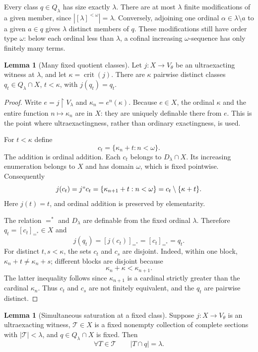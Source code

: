 \documentclass[11pt,letterpaper]{article}
\theoremstyle{definition}
\newtheorem{lemma}[definition]{Lemma}
\numberwithin{equation}{section}
\newcommand{\crit}{\operatorname{crit}}
\newcommand{\restr}{\mathbin{\upharpoonright}}
\newcommand{\Tcal}{\mathcal T}
\begin{document}
Every class $q\in Q_\lambda$ has size exactly $\lambda$. There are at most $\lambda$ finite modifications of a given member, since $|[\lambda]^{<\omega}|=\lambda$. Conversely, adjoining one ordinal $\alpha\in\lambda\setminus a$ to a given $a\in q$ gives $\lambda$ distinct members of $q$. These modifications still have order type $\omega$: below each ordinal less than $\lambda$, a cofinal increasing $\omega$-sequence has only finitely many terms.

\begin{lemma}[Many fixed quotient classes]\label{lem:fixed-classes}
Let $j:X\to V_\theta$ be an ultraexacting witness at $\lambda$, and let $\kappa=\crit(j)$. There are $\kappa$ pairwise distinct classes $q_t\in Q_\lambda\cap X$, $t<\kappa$, with $j(q_t)=q_t$.
\end{lemma}

\begin{proof}
Write $e=j\restr V_\lambda$ and $\kappa_n=e^n(\kappa)$. Because $e\in X$, the ordinal $\kappa$ and the entire function $n\mapsto\kappa_n$ are in $X$: they are uniquely definable there from $e$. This is the point where ultraexactingness, rather than ordinary exactingness, is used.

For $t<\kappa$ define
\[
c_t=\{\kappa_n+t:n<\omega\}.
\]
The addition is ordinal addition. Each $c_t$ belongs to $D_\lambda\cap X$. Its increasing enumeration belongs to $X$ and has domain $\omega$, which is fixed pointwise. Consequently
\[
j(c_t)=j``c_t
 =\{\kappa_{n+1}+t:n<\omega\}
 =c_t\setminus\{\kappa+t\}.
\]
Here $j(t)=t$, and ordinal addition is preserved by elementarity.

The relation $=^*$ and $D_\lambda$ are definable from the fixed ordinal $\lambda$. Therefore $q_t=[c_t]_{=^*}\in X$ and
\[
j(q_t)=[j(c_t)]_{=^*}=[c_t]_{=^*}=q_t.
\]
For distinct $t,s<\kappa$, the sets $c_t$ and $c_s$ are disjoint. Indeed, within one block, $\kappa_n+t\ne\kappa_n+s$; different blocks are disjoint because
\[
\kappa_n+\kappa<\kappa_{n+1}.
\]
The latter inequality follows since $\kappa_{n+1}$ is a cardinal strictly greater than the cardinal $\kappa_n$. Thus $c_t$ and $c_s$ are not finitely equivalent, and the $q_t$ are pairwise distinct.
\end{proof}

\begin{lemma}[Simultaneous saturation at a fixed class]\label{lem:saturation}
Suppose $j:X\to V_\theta$ is an ultraexacting witness, $\Tcal\in X$ is a fixed nonempty collection of complete sections with $|\Tcal|<\lambda$, and $q\in Q_\lambda\cap X$ is fixed. Then
\[
\forall T\in\Tcal\qquad |T\cap q|=\lambda.
\]
\end{lemma}
\end{document}
